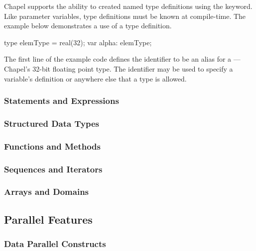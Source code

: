 Chapel supports the ability to created named type definitions using
the  keyword.  Like parameter variables, type definitions
must be known at compile-time.  The example below demonstrates a use of a type
definition.

\begin{chapel}
type elemType = real(32);
var alpha: elemType;
\end{chapel}

The first line of the example code defines the identifier 
 to be
an alias for a ---Chapel's 32-bit floating point type.
The identifier  may be used to specify a variable's
definition or anywhere else that a type is allowed.  

\subsubsection{Statements and Expressions}
\label{Statements_and_Expressions}

\subsubsection{Structured Data Types}
\label{Structured_Data_Types}

\subsubsection{Functions and Methods}
\label{Functions_and_Methods}

\subsubsection{Sequences and Iterators}
\label{Sequences_and_Iterators}


\subsubsection{Arrays and Domains}
\label{Arrays_and_Domains}


\subsection{Parallel Features}
\label{Parallel_Features}


\subsubsection{Data Parallel Constructs}
\label{Data_Parallel_Constructs}


